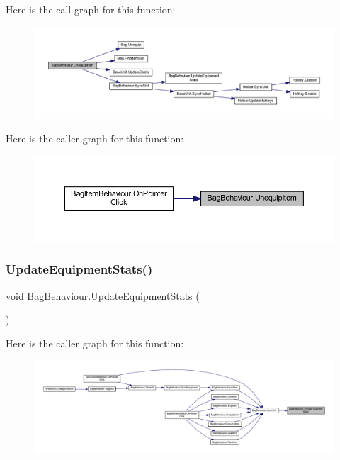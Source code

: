 Here is the call graph for this function\+:
\nopagebreak
\begin{figure}[H]
\begin{center}
\leavevmode
\includegraphics[width=350pt]{class_bag_behaviour_a61062b91187139c43e2681c220111433_cgraph}
\end{center}
\end{figure}
Here is the caller graph for this function\+:
\nopagebreak
\begin{figure}[H]
\begin{center}
\leavevmode
\includegraphics[width=350pt]{class_bag_behaviour_a61062b91187139c43e2681c220111433_icgraph}
\end{center}
\end{figure}
\mbox{\label{class_bag_behaviour_ad2e50a51bbb8f9c90a3241dbce0f87c0}} 
\subsubsection{\texorpdfstring{UpdateEquipmentStats()}{UpdateEquipmentStats()}}
{\footnotesize\ttfamily void Bag\+Behaviour.\+Update\+Equipment\+Stats (\begin{DoxyParamCaption}{ }\end{DoxyParamCaption})}

Here is the caller graph for this function\+:
\nopagebreak
\begin{figure}[H]
\begin{center}
\leavevmode
\includegraphics[width=350pt]{class_bag_behaviour_ad2e50a51bbb8f9c90a3241dbce0f87c0_icgraph}
\end{center}
\end{figure}


